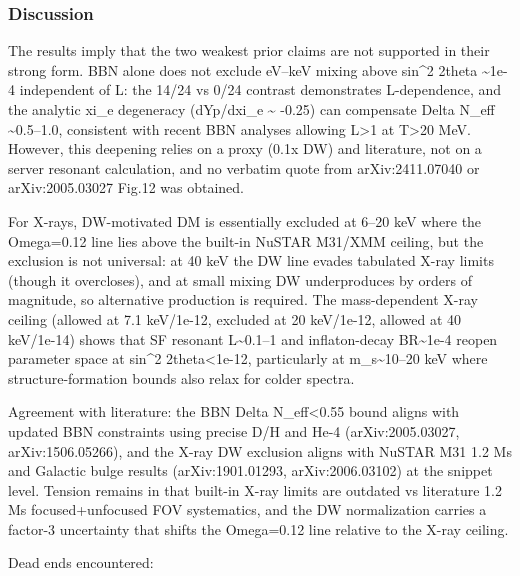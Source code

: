 \documentclass[11pt,a4paper]{article}
\begin{document}
\subsubsection*{Discussion}
The results imply that the two weakest prior claims are not supported in their strong form. BBN alone does not exclude eV--keV mixing above sin\textasciicircum{}2 2theta \textasciitilde{}1e-4 independent of L: the 14/24 vs 0/24 contrast demonstrates L-dependence, and the analytic xi\_e degeneracy (dYp/dxi\_e \textasciitilde{} -0.25) can compensate Delta N\_eff \textasciitilde{}0.5--1.0, consistent with recent BBN analyses allowing L\textgreater{}1 at T\textgreater{}20 MeV. However, this deepening relies on a proxy (0.1x DW) and literature, not on a server resonant calculation, and no verbatim quote from arXiv:2411.07040 or arXiv:2005.03027 Fig.12 was obtained.

For X-rays, DW-motivated DM is essentially excluded at 6--20 keV where the Omega=0.12 line lies above the built-in NuSTAR M31/XMM ceiling, but the exclusion is not universal: at 40 keV the DW line evades tabulated X-ray limits (though it overcloses), and at small mixing DW underproduces by orders of magnitude, so alternative production is required. The mass-dependent X-ray ceiling (allowed at 7.1 keV/1e-12, excluded at 20 keV/1e-12, allowed at 40 keV/1e-14) shows that SF resonant L\textasciitilde{}0.1--1 and inflaton-decay BR\textasciitilde{}1e-4 reopen parameter space at sin\textasciicircum{}2 2theta\textless{}1e-12, particularly at m\_s\textasciitilde{}10--20 keV where structure-formation bounds also relax for colder spectra.

Agreement with literature: the BBN Delta N\_eff\textless{}0.55 bound aligns with updated BBN constraints using precise D/H and He-4 (arXiv:2005.03027, arXiv:1506.05266), and the X-ray DW exclusion aligns with NuSTAR M31 1.2 Ms and Galactic bulge results (arXiv:1901.01293, arXiv:2006.03102) at the snippet level. Tension remains in that built-in X-ray limits are outdated vs literature 1.2 Ms focused+unfocused FOV systematics, and the DW normalization carries a factor-3 uncertainty that shifts the Omega=0.12 line relative to the X-ray ceiling.

Dead ends encountered:
\end{document}
